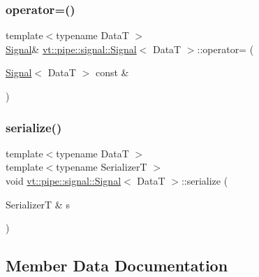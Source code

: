 \subsubsection{\texorpdfstring{operator=()}{operator=()}}
{\footnotesize\ttfamily template$<$typename DataT $>$ \\
\hyperlink{structvt_1_1pipe_1_1signal_1_1_signal}{Signal}\& \hyperlink{structvt_1_1pipe_1_1signal_1_1_signal}{vt\+::pipe\+::signal\+::\+Signal}$<$ DataT $>$\+::operator= (\begin{DoxyParamCaption}\item[{\hyperlink{structvt_1_1pipe_1_1signal_1_1_signal}{Signal}$<$ DataT $>$ const \&}]{ }\end{DoxyParamCaption})\hspace{0.3cm}{\ttfamily [default]}}

\mbox{\label{structvt_1_1pipe_1_1signal_1_1_signal_a6b39c1352116ba4464740c62d340fffa}} 
\subsubsection{\texorpdfstring{serialize()}{serialize()}}
{\footnotesize\ttfamily template$<$typename DataT $>$ \\
template$<$typename SerializerT $>$ \\
void \hyperlink{structvt_1_1pipe_1_1signal_1_1_signal}{vt\+::pipe\+::signal\+::\+Signal}$<$ DataT $>$\+::serialize (\begin{DoxyParamCaption}\item[{SerializerT \&}]{s }\end{DoxyParamCaption})\hspace{0.3cm}{\ttfamily [inline]}}



\subsection{Member Data Documentation}
\mbox{\label{structvt_1_1pipe_1_1signal_1_1_signal_ad868339a532c909881ae4c096dc8e3cd}} 
